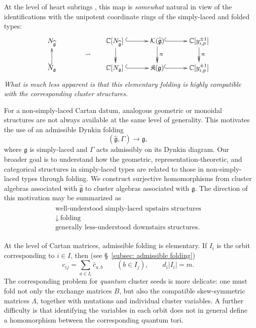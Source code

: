 \documentclass[12pt, leqno]{amsart}
\numberwithin{equation}{section}
\theoremstyle{plain}
\theoremstyle{definition}
\newcommand{\g}{\mathfrak{g}}
\newcommand{\C}{\mathbb{C}}
\newcommand{\im}{\imath}
\newcommand{\hc}{\widehat{c}}
\newcommand{\hg}{{\widehat{\g}}}
\newcommand{\frakK}{\mathfrak{K}}
\newcommand{\calK}{\mathcal{K}}
\begin{document}
At the level of heart subrings \cite{HL15,JLO2}, this map is \emph{somewhat} natural
in view of the identifications with the unipotent coordinate rings of
the simply-laced and folded types:
\[
\xymatrix@C=3em@R=0.7em{
N_{\hg} && \C[N_{\hg}] \; \ar@{->>}[dd] \ar@{^{(}->}[r]
& \calK(\hg) \ar@{->>}[dd]^{\uppi} \ar@{^{(}->}[r]
& \C[y_{\im,p}^{\pm1}] \ar@{->>}[dd]^{\uppi} \\
& \ar@{}[r]|{\leadsto \qquad \quad } & \\
N_{\g} \ar@{^{(}->}[uu]
&& \C[N_{\g}] \; \ar@{^{(}->}[r]
& \frakK(\g) \ar@{^{(}->}[r]
& \C[y_{i,p}^{\pm1}]
}
\]
\emph{What is much less apparent is that this elementary folding is
highly compatible with the corresponding cluster structures.}

For a non-simply-laced Cartan datum, analogous geometric or monoidal
structures are not always available at the same level of generality.
This motivates the use of an admissible Dynkin folding 
\[
(\hg,\Gamma)\longrightarrow\g,
\]
where $\hg$ is simply-laced and $\Gamma$ acts admissibly on its Dynkin
diagram. Our broader goal is to understand how the geometric,
representation-theoretic, and categorical structures in simply-laced
types are related to those in non-simply-laced types through folding. 
 We construct surjective homomorphisms from cluster algebras associated with $\hg$ to cluster algebras associated with $\g$.{}
The direction of this motivation may be summarized as
\begin{align} \label{eq: philosophy}
\begin{array}{c}
\text{well-understood simply-laced upstairs structures}\\
\downarrow\ \text{folding}\\
\text{generally less-understood downstairs structures}.
\end{array}
\end{align}

\smallskip

At the level of Cartan matrices, admissible folding is elementary. If
$I_i$ is the orbit corresponding to $i\in I$, then (see \S~\ref{subsec: admissible folding})
\[
c_{ij}=\sum_{a\in I_i}\hc_{a,b}
\qquad(b\in I_j),
\qquad
d_i|I_i|=m.
\]
The corresponding problem for \emph{quantum} cluster seeds is more delicate:
one must fold not only the exchange matrices $B$, but also the
compatible skew-symmetric matrices $\Lambda$, together with mutations
and individual cluster variables. A further difficulty is that identifying
the variables in each orbit does not in general define a homomorphism
between the corresponding quantum tori.
\end{document}
